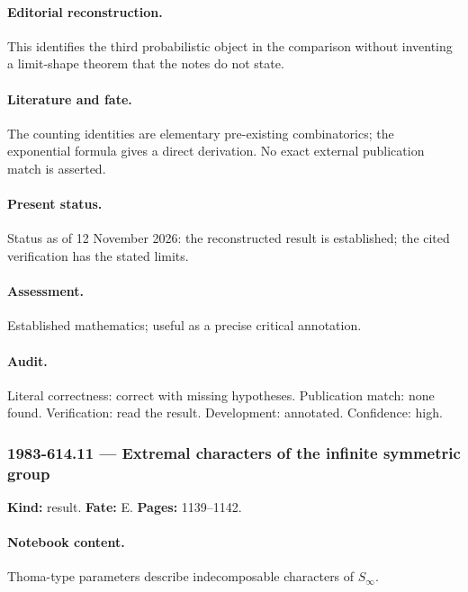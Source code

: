 \paragraph{Editorial reconstruction.} This identifies the third probabilistic object in the comparison without inventing a limit-shape theorem that the notes do not state.

\paragraph{Literature and fate.} The counting identities are elementary pre-existing combinatorics; the exponential formula gives a direct derivation. No exact external publication match is asserted.

\paragraph{Present status.} Status as of 12 November 2026: the reconstructed result is established; the cited verification has the stated limits.

\paragraph{Assessment.} Established mathematics; useful as a precise critical annotation.

\paragraph{Audit.} Literal correctness: correct with missing hypotheses. Publication match: none found. Verification: read the result. Development: annotated. Confidence: high.

\subsubsection{1983-614.11 --- Extremal characters of the infinite symmetric group}

\label{item:1983-614.11}

\noindent\textbf{Kind:} result. \textbf{Fate:} E. \textbf{Pages:} 1139--1142.\par

\paragraph{Notebook content.} Thoma-type parameters describe indecomposable characters of $S_\infty$.

